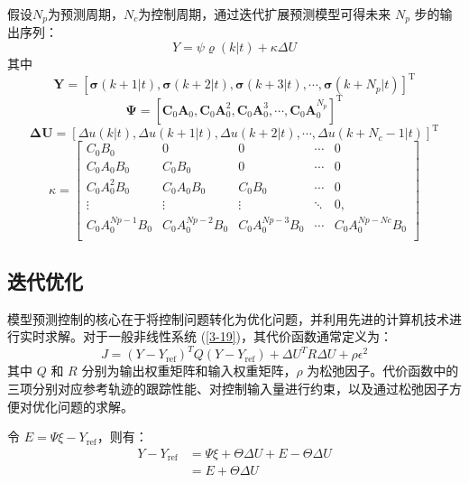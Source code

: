 \documentclass[lang=chs, degree=master, blindreview=false, winfonts=true]{yanputhesis}
\begin{document}
假设$N_p$为预测周期，$N_c$为控制周期，通过迭代扩展预测模型可得未来 $N_p$ 步的输出序列：
\begin{equation}
	Y=\psi\varrho(k|t)+\kappa\Delta U
\end{equation}
其中$$
\boldsymbol{Y} = 
\left[
	\boldsymbol{\sigma}(k+1|t) , \boldsymbol{\sigma}(k+2|t) , \boldsymbol{\sigma}(k+3|t) , \cdots , \boldsymbol{\sigma}(k+N_p|t)
\right]^\mathrm{T}$$
$$\boldsymbol{\Psi} = 
\left[
	\boldsymbol{C}_0\boldsymbol{A}_0 , \boldsymbol{C}_0\boldsymbol{A}_0^2 , \boldsymbol{C}_0\boldsymbol{A}_0^3 , \cdots , \boldsymbol{C}_0\boldsymbol{A}_0^{N_p}
\right]^\mathrm{T}$$
$$\boldsymbol{\Delta U} = 
\left[
	\Delta u(k|t) , \Delta u(k+1|t) , \Delta u(k+2|t) , \cdots , \Delta u(k+N_c-1|t)
\right]^\mathrm{T}$$
$$\left.\kappa=\left[\begin{array}{ccccc}{C_{0}B_{0}}&{0}&{0}&{\cdots}&{0}\\{C_{0}A_{0}B_{0}}&{C_{0}B_{0}}&{0}&{\cdots}&{0}\\{C_{0}A_{0}^{2}B_{0}}&{C_{0}A_{0}B_{0}}&{C_{0}B_{0}}&{\cdots}&{0}\\{\vdots}&{\vdots}&{\vdots}&{\ddots}&{0,}\\{C_{0}A_{0}^{Np-1}B_{0}}&{C_{0}A_{0}^{Np-2}B_{0}}&{C_{0}A_{0}^{Np-3}B_{0}}&{\cdots}&{C_{0}A_{0}^{Np-Nc}B_{0}}\\\end{array}\right.\right]$$


\subsection{迭代优化}
模型预测控制的核心在于将控制问题转化为优化问题，并利用先进的计算机技术进行实时求解。对于一般非线性系统 (\ref{3-19})，其代价函数通常定义为：
\begin{equation}
	J = (Y - Y_\text{ref})^T Q (Y - Y_\text{ref}) + \Delta U^T R \Delta U + \rho \epsilon^2
\end{equation}
其中 $Q$ 和 $R$ 分别为输出权重矩阵和输入权重矩阵，$\rho$ 为松弛因子。代价函数中的三项分别对应参考轨迹的跟踪性能、对控制输入量进行约束，以及通过松弛因子方便对优化问题的求解。

令 $E = \Psi \xi - Y_{\text{ref}}$，则有：
\begin{equation}
	\begin{aligned}
		Y - Y_{\text{ref}} &= \Psi \xi + \Theta \Delta U + E - \Theta \Delta U 
		\\&= E + \Theta \Delta U
	\end{aligned}
\end{equation}
\end{document}
